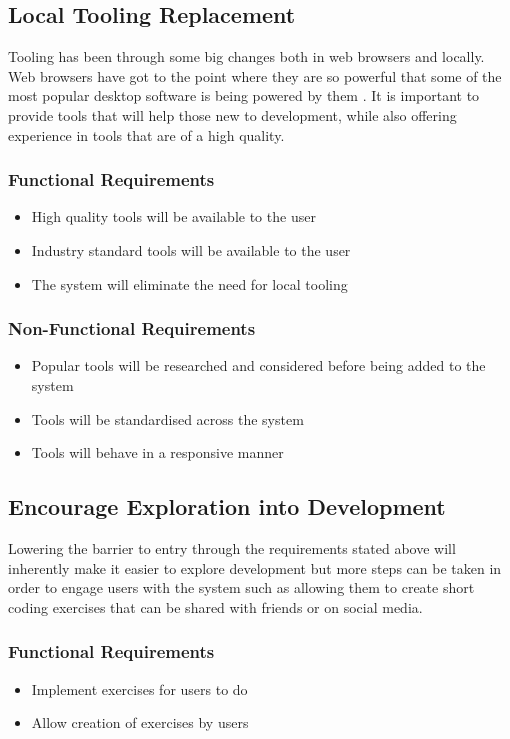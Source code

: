 \subsection{Local Tooling Replacement}
Tooling has been through some big changes both in web browsers and locally. Web browsers have got to the point where they are so powerful that some of the most popular desktop software is being powered by them \cite{carlo}. It is important to provide tools that will help those new to development, while also offering experience in tools that are of a high quality.

\subsubsection{Functional Requirements}
\begin{itemize}
    \item High quality tools will be available to the user
    \item Industry standard tools will be available to the user
    \item The system will eliminate the need for local tooling
\end{itemize}
\subsubsection{Non-Functional Requirements}
\begin{itemize}
    \item Popular tools will be researched and considered before being added to the system
    \item Tools will be standardised across the system
    \item Tools will behave in a responsive manner
\end{itemize}

\subsection{Encourage Exploration into Development}
Lowering the barrier to entry through the requirements stated above will inherently make it easier to explore development but more steps can be taken in order to engage users with the system such as allowing them to create short coding exercises that can be shared with friends or on social media.

\subsubsection{Functional Requirements}
\begin{itemize}
    \item Implement exercises for users to do
    \item Allow creation of exercises by users
\end{itemize}
